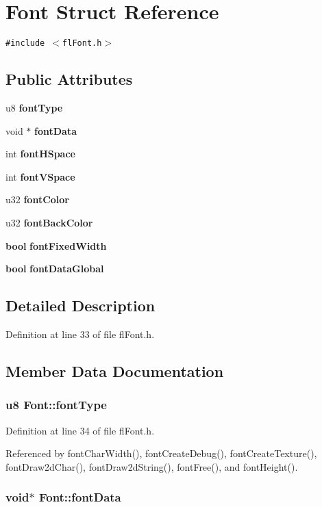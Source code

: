 \section{Font Struct Reference}
\label{structFont}
{\tt \#include $<$fl\-Font.h$>$}

\subsection*{Public Attributes}
\begin{CompactItemize}
\item 
u8 {\bf font\-Type}
\item 
void $\ast$ {\bf font\-Data}
\item 
int {\bf font\-HSpace}
\item 
int {\bf font\-VSpace}
\item 
u32 {\bf font\-Color}
\item 
u32 {\bf font\-Back\-Color}
\item 
{\bf bool} {\bf font\-Fixed\-Width}
\item 
{\bf bool} {\bf font\-Data\-Global}
\end{CompactItemize}


\subsection{Detailed Description}




Definition at line 33 of file fl\-Font.h.

\subsection{Member Data Documentation}
\subsubsection{\setlength{\rightskip}{0pt plus 5cm}u8 {\bf Font::font\-Type}}\label{structFont_06c6143754e51079a20fd2963ce70567}




Definition at line 34 of file fl\-Font.h.

Referenced by font\-Char\-Width(), font\-Create\-Debug(), font\-Create\-Texture(), font\-Draw2d\-Char(), font\-Draw2d\-String(), font\-Free(), and font\-Height().
\subsubsection{\setlength{\rightskip}{0pt plus 5cm}void$\ast$ {\bf Font::font\-Data}}\label{structFont_d02307751251813ef2bf1079d26c9bbf}




